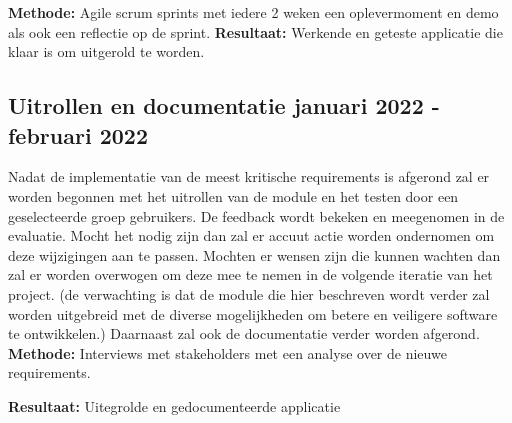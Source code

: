 \textbf{Methode:} Agile scrum sprints met iedere 2 weken een oplevermoment en demo als ook een reflectie op de sprint.
\textbf{Resultaat:} Werkende en geteste applicatie die klaar is om uitgerold te worden.

\subsection{Uitrollen en documentatie \textbf{januari 2022 - februari 2022 }}\label{subsec:uitrollen-en-documentatie}
Nadat de implementatie van de meest kritische requirements is afgerond zal er worden begonnen met het uitrollen van de module en het testen door een geselecteerde groep gebruikers. De feedback wordt bekeken en meegenomen in de evaluatie. Mocht het nodig zijn dan zal er accuut actie worden ondernomen om deze wijzigingen aan te passen. Mochten er wensen zijn die kunnen wachten dan zal er worden overwogen om deze mee te nemen in de volgende iteratie van het project. (de verwachting is dat de module die hier beschreven wordt verder zal worden uitgebreid met de diverse mogelijkheden om betere en veiligere software te ontwikkelen.) Daarnaast zal ook de documentatie verder worden afgerond.
\textbf{Methode:} Interviews met stakeholders met een analyse over de nieuwe requirements.

\textbf{Resultaat:} Uitegrolde en gedocumenteerde applicatie
